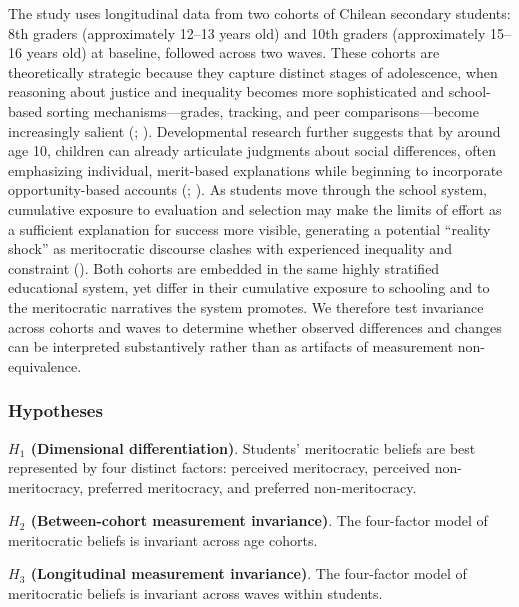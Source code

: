 \documentclass[
  13pt,
]{article}
\begin{document}
The study uses longitudinal data from two cohorts of Chilean secondary
students: 8th graders (approximately 12--13 years old) and 10th graders
(approximately 15--16 years old) at baseline, followed across two waves.
These cohorts are theoretically strategic because they capture distinct
stages of adolescence, when reasoning about justice and inequality
becomes more sophisticated and school-based sorting mechanisms---grades,
tracking, and peer comparisons---become increasingly salient
(;
). Developmental
research further suggests that by around age 10, children can already
articulate judgments about social differences, often emphasizing
individual, merit-based explanations while beginning to incorporate
opportunity-based accounts (; ).
As students move through the school system, cumulative exposure to
evaluation and selection may make the limits of effort as a sufficient
explanation for success more visible, generating a potential ``reality
shock'' as meritocratic discourse clashes with experienced inequality
and constraint (). Both cohorts are embedded in the same highly stratified
educational system, yet differ in their cumulative exposure to schooling
and to the meritocratic narratives the system promotes. We therefore
test invariance across cohorts and waves to determine whether observed
differences and changes can be interpreted substantively rather than as
artifacts of measurement non-equivalence.

\subsubsection{Hypotheses}\label{hypotheses}

\textbf{\(H_1\) (Dimensional differentiation)}. Students' meritocratic
beliefs are best represented by four distinct factors: perceived
meritocracy, perceived non-meritocracy, preferred meritocracy, and
preferred non-meritocracy.

\textbf{\(H_2\) (Between-cohort measurement invariance)}. The
four-factor model of meritocratic beliefs is invariant across age
cohorts.

\textbf{\(H_3\) (Longitudinal measurement invariance)}. The four-factor
model of meritocratic beliefs is invariant across waves within students.
\end{document}
